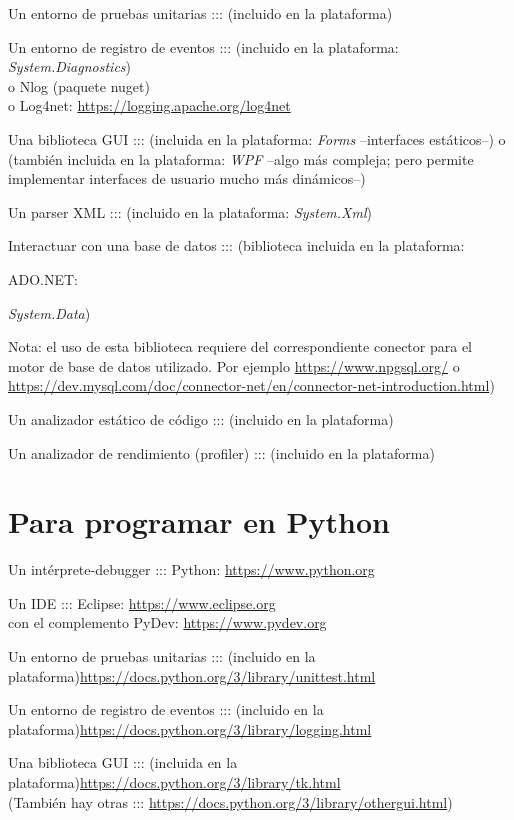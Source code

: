 \documentclass[spanish,12pt,a4paper,final,oneside]{book}
\begin{document}
Un entorno de pruebas unitarias :::  (incluido en la plataforma)

Un entorno de registro de eventos ::: (incluido en la plataforma: \textit{System.Diagnostics})
\\o Nlog (paquete nuget)
\\o Log4net: \url{https://logging.apache.org/log4net}

Una biblioteca GUI ::: (incluida en la plataforma: \textit{Forms} --interfaces estáticos--) o (también incluida en la plataforma: \textit{WPF} --algo más compleja; pero permite implementar interfaces de usuario mucho más dinámicos--) 

Un parser XML ::: (incluido en la plataforma: \textit{System.Xml})

Interactuar con una base de datos ::: (biblioteca incluida en la plataforma: \begin{footnotesize}ADO.NET:\end{footnotesize} \textit{ System.Data}) \begin{footnotesize}Nota: el uso de esta biblioteca requiere del correspondiente conector para el motor de base de datos utilizado. Por ejemplo \url{https://www.npgsql.org/} o \url{https://dev.mysql.com/doc/connector-net/en/connector-net-introduction.html})\end{footnotesize} 

Un analizador estático de código :::   (incluido en la plataforma)

Un analizador de rendimiento (profiler) :::   (incluido en la plataforma)


\section{Para programar en Python}

Un intérprete-debugger ::: Python: \url{https://www.python.org} 

Un IDE ::: Eclipse: \url{https://www.eclipse.org} 
\\con el complemento PyDev: \url{https://www.pydev.org} 

Un entorno de pruebas unitarias ::: (incluido en la plataforma)\url{https://docs.python.org/3/library/unittest.html}

Un entorno de registro de eventos ::: (incluido en la plataforma)\url{https://docs.python.org/3/library/logging.html}

Una biblioteca GUI ::: (incluida en la plataforma)\url{https://docs.python.org/3/library/tk.html}
\\(También hay otras ::: \url{https://docs.python.org/3/library/othergui.html})
\end{document}
